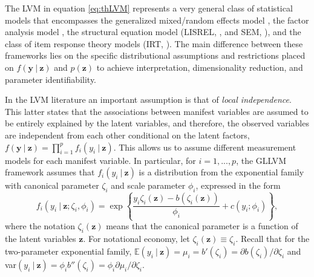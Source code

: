 \documentclass[11pt, a4paper]{article}
\newcommand{\cond}{\!~|~\!}
\begin{document}
The LVM in equation \eqref{eq:thLVM} represents a very general class of statistical models that encompasses the generalized mixed/random effects model \citep{Laird&Ware_Biometrics1982, Zeger&Karim_JASA1991, Lee&Nelder_JRSS1996, Lee&Nelder_Biometrika2001, Lee&Nelder_JRSS2006}, the factor analysis model \citep{Lawley&Maxwell_JRSS1962, LM1971}, the structural equation model (LISREL, \citealp{Joreskog_Biometrika1970, Joreskog_ETS1970, Joreskog_1973}, and SEM, \citealp{Bollen1989}), and the class of item response theory models (IRT, \citealp{LN1968, Bartholomew_JRSS1980, Bock&Aitkin_Psychometrika1981, BK1999}). The main difference between these frameworks lies on the specific distributional assumptions and restrictions placed on $f(\mathbf{y} \cond \mathbf{z})$ and $p(\mathbf{z})$ to achieve interpretation, dimensionality reduction, and parameter identifiability.


In the LVM literature an important assumption is that of \textit{local independence}. This latter states that the associations between manifest variables are assumed to be entirely explained by the latent variables, and therefore, the observed variables are independent from each other conditional on the latent factors, $f(\mathbf{y}\cond\mathbf{z}) = \prod_{i=1}^p f_i(y_i\cond\mathbf{z})$. This allows us to assume different measurement models for each manifest variable. In particular, for $i=1,...,p$, the GLLVM framework assumes that $f_i(y_i\cond\mathbf{z})$ is a distribution from the exponential family with canonical parameter $\zeta_i$ and scale parameter $\phi_i$, expressed in the form
\begin{equation}
f_i(y_i \cond \mathbf{z}; \zeta_i,\phi_i) = \exp\left\{\frac{y_i\zeta_i(\mathbf{z}) - b(\zeta_i(\mathbf{z}))}{\phi_i} + c(y_i;\phi_i)\right\}, \label{eq:expd}
\end{equation}
where the notation $\zeta_i(\mathbf{z})$ means that the canonical parameter is a function of the latent variables $\mathbf{z}$. For notational economy, let $\zeta_i(\mathbf{z}) \equiv \zeta_i$. Recall that for the two-parameter exponential family, $\mathbb{E}(y_i\cond\mathbf{z}) = \mu_i = b'(\zeta_i) = \partial b(\zeta_i)/ \partial \zeta_i$ and var$(y_i\cond\mathbf{z}) = \phi_i b''(\zeta_i) = \phi_i\partial \mu_i/ \partial \zeta_i$.
\end{document}
